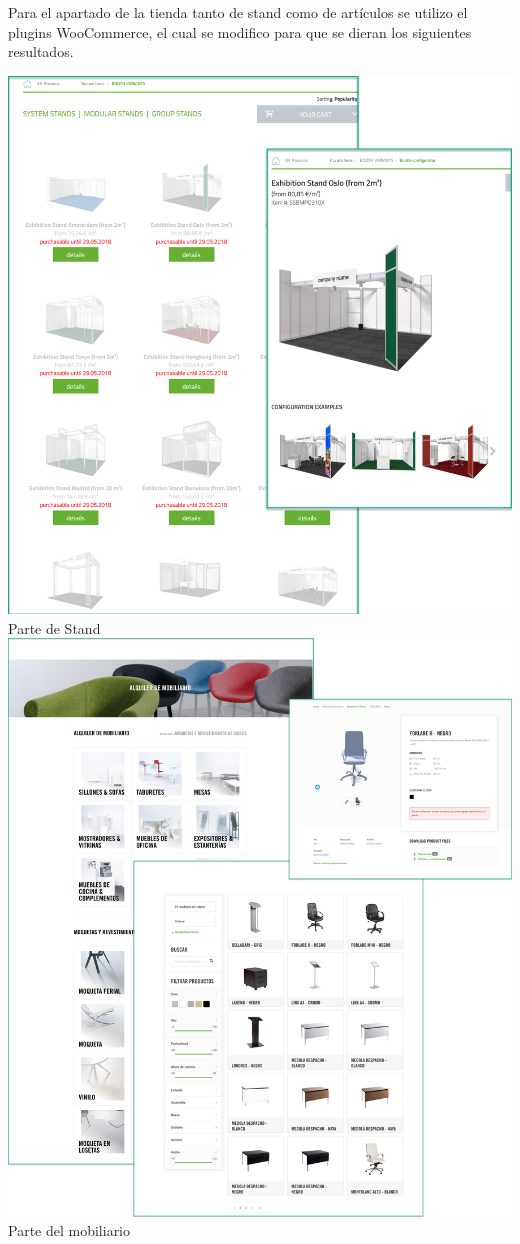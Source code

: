 \begin{itemize}
			Para el apartado de la tienda tanto de stand como de artículos se utilizo el plugins WooCommerce, el cual se modifico para que se dieran los siguientes resultados.
			
			\begin{center}
				\includegraphics[scale=0.35]{image/stand.png}\\
				Parte de Stand\\
				\includegraphics[scale=0.15]{image/mobi.png}\\
				Parte del mobiliario
			\end{center}
		\end{itemize}
		
